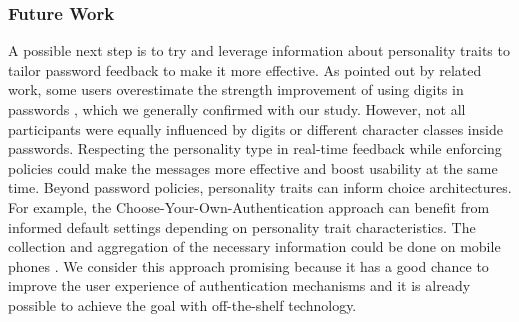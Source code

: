 \subsubsection{Future Work}
A possible next step is to try and leverage information about personality traits to tailor password feedback to make it more effective. As pointed out by related work, some users overestimate the strength improvement of using digits in passwords \cite{Ur2016PerceptionsPassword}, which we generally confirmed with our study. However, not all participants were equally influenced by digits or different character classes inside passwords. Respecting the personality type in real-time feedback while enforcing policies could make the messages more effective and boost usability at the same time. Beyond password policies, personality traits can inform choice architectures. For example, the Choose-Your-Own-Authentication approach \cite{Forget2015CYOA} can benefit from informed default settings depending on personality trait characteristics. The collection and aggregation of the necessary information could be done on mobile phones \cite{DeMontjoye2013}. We consider this approach promising because it has a good chance to improve the user experience of authentication mechanisms and it is already possible to achieve the goal with off-the-shelf technology.





\noindent
{}

